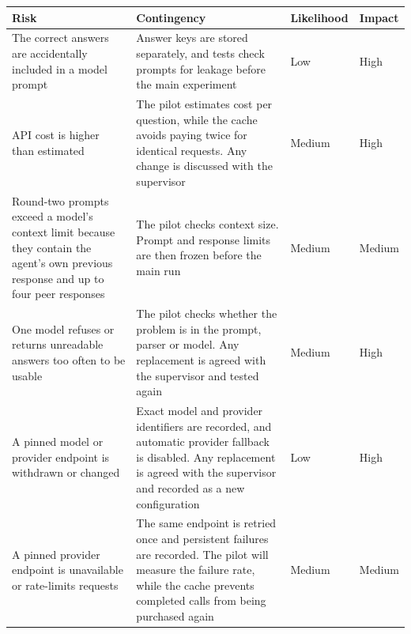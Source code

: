 \documentclass[12pt,a4paper]{article}
\begin{document}
\begin{table}[!htbp]
    \centering
    \footnotesize
    \renewcommand{\arraystretch}{1.1}

    \begin{tabularx}{\textwidth}{@{}LLll@{}}
        \toprule
        \textbf{Risk} &
        \textbf{Contingency} &
        \textbf{Likelihood} &
        \textbf{Impact} \\
        \midrule

        The correct answers are accidentally included in a model prompt &
        Answer keys are stored separately, and tests check prompts for leakage
        before the main experiment &
        Low &
        High \\

        \midrule

        API cost is higher than estimated &
        The pilot estimates cost per question, while the cache avoids paying
        twice for identical requests. Any change is discussed with the
        supervisor &
        Medium &
        High \\

        \midrule

        Round-two prompts exceed a model's context limit because they contain
        the agent's own previous response and up to four peer responses &
        The pilot checks context size. Prompt and response limits are then
        frozen before the main run &
        Medium &
        Medium \\

        \midrule

        One model refuses or returns unreadable answers too often to be usable &
        The pilot checks whether the problem is in the prompt, parser or model.
        Any replacement is agreed with the supervisor and tested again &
        Medium &
        High \\

        \midrule

        A pinned model or provider endpoint is withdrawn or changed &
        Exact model and provider identifiers are recorded, and automatic
        provider fallback is disabled. Any replacement is agreed with the
        supervisor and recorded as a new configuration &
        Low &
        High \\

        \midrule

        A pinned provider endpoint is unavailable or rate-limits requests &
        The same endpoint is retried once and persistent failures are recorded.
        The pilot will measure the failure rate, while the cache prevents
        completed calls from being purchased again &
        Medium &
        Medium \\


\end{tabularx}
\end{table}
\end{document}
